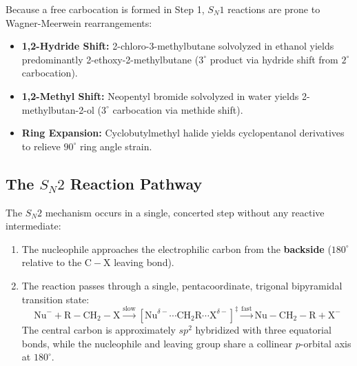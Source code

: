 \documentclass[10pt,a4paper]{article}
\begin{document}
\begin{usecasebox}
Because a free carbocation is formed in Step 1, $S_N1$ reactions are prone to Wagner-Meerwein rearrangements:
\begin{itemize}
  \item \textbf{1,2-Hydride Shift:} 2-chloro-3-methylbutane solvolyzed in ethanol yields predominantly 2-ethoxy-2-methylbutane ($3^\circ$ product via hydride shift from $2^\circ$ carbocation).
  \item \textbf{1,2-Methyl Shift:} Neopentyl bromide solvolyzed in water yields 2-methylbutan-2-ol ($3^\circ$ carbocation via methide shift).
  \item \textbf{Ring Expansion:} Cyclobutylmethyl halide yields cyclopentanol derivatives to relieve $90^\circ$ ring angle strain.
\end{itemize}
\end{usecasebox}

\subsection{The \texorpdfstring{$S_N2$}{SN2} Reaction Pathway}

\begin{conceptbox}
The $S_N2$ mechanism occurs in a single, concerted step without any reactive intermediate:
\begin{enumerate}[leftmargin=*]
  \item The nucleophile approaches the electrophilic carbon from the \textbf{backside} ($180^\circ$ relative to the $\mathrm{C-X}$ leaving bond).
  \item The reaction passes through a single, pentacoordinate, trigonal bipyramidal transition state:
  \begin{equation}
    \mathrm{Nu}^- + \mathrm{R-CH_2-X} \xrightarrow{\text{slow}} \left[ \mathrm{Nu}^{\delta-}\cdots \mathrm{CH_2R} \cdots \mathrm{X}^{\delta-} \right]^\ddagger \xrightarrow{\text{fast}} \mathrm{Nu-CH_2-R} + \mathrm{X}^-
  \end{equation}
  The central carbon is approximately $sp^2$ hybridized with three equatorial bonds, while the nucleophile and leaving group share a collinear $p$-orbital axis at $180^\circ$.
\end{enumerate}
\end{conceptbox}
\end{document}
